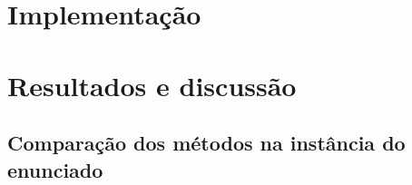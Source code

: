 \documentclass[12pt,a4paper]{article}
\begin{document}
\section{Implementação}
\label{sec:implementacao}

\section{Resultados e discussão}
\label{sec:resultados}

\subsection{Comparação dos métodos na instância do enunciado}
\label{sec:comparacao}
\end{document}
